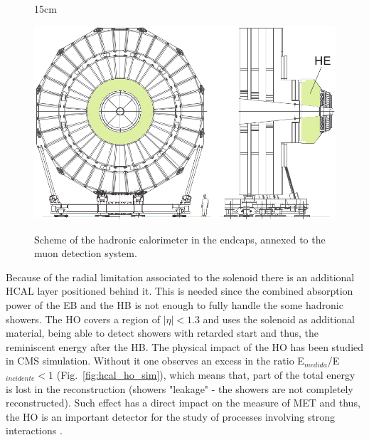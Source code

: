 \begin{figure}[htbp]{15cm}
\caption{Scheme of the hadronic calorimeter in the endcaps, annexed to the muon detection system.}
\includegraphics[scale=0.4]{ChapterCMS/figs/hcal_he.png}
\label{fig:hcal_he}
\end{figure}

Because of the radial limitation associated to the solenoid there is an additional HCAL layer positioned behind it. This is needed since the combined absorption power of the EB and the HB is not enough to fully handle the some hadronic showers. The HO covers a region of $|\eta| < 1.3$ and uses the solenoid as additional material, being able to detect showers with retarded start and thus, the reminiscent energy after the HB. The physical impact of the HO has been studied in CMS simulation. Without it one observes an excess in the ratio E$_{medida}$/E$_{incidente} < 1$ (Fig.~\ref{fig:hcal_ho_sim}), which means that, part of the total energy is lost in the reconstruction (showers "leakage" - the showers are not completely reconstructed). Such effect has a direct impact on the measure of MET and thus, the HO is an important detector for the study of processes involving strong interactions \cite{bib:JINST-3-362-2008,bib:hcal-tdr-1997}.

